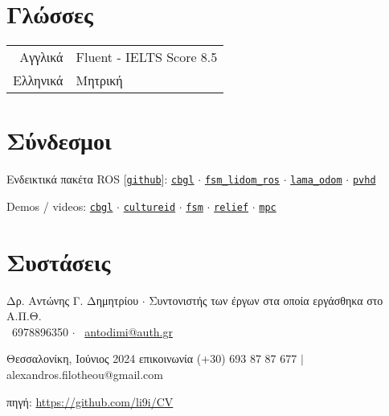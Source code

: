 \documentclass[a4paper,10pt,twoside]{article}
\begin{document}

\section{Γλώσσες}

\begin{tabular}{rp{12cm}}
Αγγλικά & Fluent - IELTS Score 8.5\\
Ελληνικά & Μητρική
\end{tabular}

\section{Σύνδεσμοι}

Ενδεικτικά πακέτα ROS [\href{https://github.com/li9i}{\texttt{github}}]:
\href{https://github.com/li9i/cbgl}{\texttt{cbgl}} $\cdot$
\href{https://github.com/li9i/fsm\_lidom\_ros}{\texttt{fsm\_lidom\_ros}} $\cdot$
\href{https://github.com/li9i/lama\_odom}{\texttt{lama\_odom}} $\cdot$
\href{https://github.com/li9i/pandora\_vision\_2014/tree/hydro-devel/pandora\_vision\_hole\_detector}{\texttt{pvhd}}

Demos / videos: \href{https://www.youtube.com/watch?v=xaDKjI0WkDc}{\texttt{cbgl}} $\cdot$ \href{https://cultureid.web.auth.gr/?page\_id=200&lang=en}{\texttt{cultureid}} $\cdot$ \href{https://www.youtube.com/watch?v=hB4qsHCEXGI}{\texttt{fsm}} $\cdot$ \href{https://relief.web.auth.gr/}{\texttt{relief}} $\cdot$ \href{https://www.youtube.com/watch?v=937OZez1iN8}{\texttt{mpc}}
\\

\section{Συστάσεις}
\noindent Δρ. Αντώνης Γ. Δημητρίου $\cdot$ Συντονιστής των έργων στα οποία εργάσθηκα στο Α.Π.Θ. \\
\faPhone \ 6978896350 $\cdot$ \faEnvelopeO \ \href{mailto:antodimi@auth.gr}{antodimi@auth.gr} \\


\vfill
{\noindent
  \small Θεσσαλονίκη, Ιούνιος 2024  \hfill επικοινωνία (+30) 693 87 87 677 $|$ alexandros.filotheou@gmail.com

 \hfill πηγή: \href{https://github.com/li9i/CV}{https://github.com/li9i/CV}}
\end{document}
